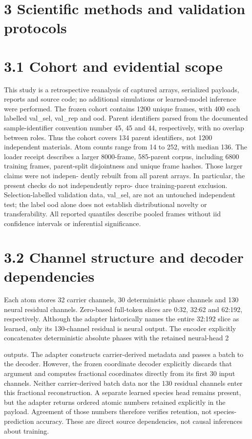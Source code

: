 \documentclass[11pt]{article}
\begin{document}
\section*{3 Scientific methods and validation protocols}


\section*{3.1 Cohort and evidential scope}

This study is a retrospective reanalysis of captured arrays, serialized payloads, reports and source
code; no additional simulations or learned-model inference were performed. The frozen cohort
contains 1200 unique frames, with 400 each labelled val\_sel, val\_rep and ood. Parent identifiers
parsed from the documented sample-identifier convention number 45, 45 and 44, respectively, with
no overlap between roles. Thus the cohort covers 134 parent identifiers, not 1200 independent
materials. Atom counts range from 14 to 252, with median 136.
The loader receipt describes a larger 8000-frame, 585-parent corpus, including 6800 training
frames, parent-split disjointness and unique frame hashes. Those larger claims were not indepen-
dently rebuilt from all parent arrays. In particular, the present checks do not independently repro-
duce training-parent exclusion. Selection-labelled validation data, val\_sel, are not an untouched
independent test; the label ood alone does not establish distributional novelty or transferability. All
reported quantiles describe pooled frames without iid confidence intervals or inferential significance.

\section*{3.2 Channel structure and decoder dependencies}

Each atom stores 32 carrier channels, 30 deterministic phase channels and 130 neural residual
channels. Zero-based full-token slices are 0:32, 32:62 and 62:192, respectively. Although the adapter
historically names the entire 32:192 slice as learned, only its 130-channel residual is neural output.
The encoder explicitly concatenates deterministic absolute phases with the retained neural-head
2

outputs.
The adapter constructs carrier-derived metadata and passes a batch to the decoder. However, the
frozen coordinate decoder explicitly discards that argument and computes fractional coordinates
directly from its first 30 input channels. Neither carrier-derived batch data nor the 130 residual
channels enter this fractional reconstruction. A separate learned species head remains present,
but the adapter returns ordered atomic numbers retained explicitly in the payload. Agreement of
those numbers therefore verifies retention, not species-prediction accuracy. These are direct source
dependencies, not causal inferences about training.
\end{document}
